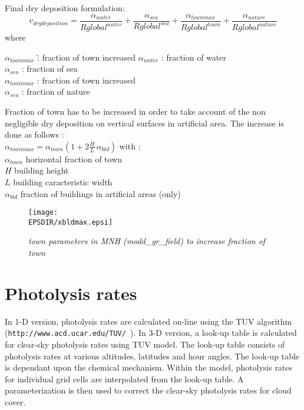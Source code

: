 Final dry deposition formulation:
$$
v_{dry deposition} = \frac{\alpha_{water}}{Rglobal^{water}} +
\frac{\alpha_{sea}}{Rglobal^{sea}} +
\frac{\alpha_{townmax}}{Rglobal^{town}} +
\frac{\alpha_{nature}}{Rglobal^{nature}}
$$
where\\ 
\begin{tabbing}
$\alpha_{townmax}$ \=: fraction of town increased \kill
$\alpha_{water}$ \> : fraction of water \\
$\alpha_{sea}$ \> : fraction of sea \\
$\alpha_{townmax}$ \> : fraction of town increased \\
$\alpha_{sea}$ \> : fraction of nature 
\end{tabbing}
Fraction of town has to be increased in order to take account of the non
negligible dry deposition on vertical surfaces in artificial
area. The increase is done as follows :\\
$\alpha_{townmax} = \alpha_{town} (1+2 \frac{H}{L} \, \alpha_{bld})$
with : \\
$\alpha_{town}$ horizontal fraction of town \\
$H$ building height \\
$L$ building caracteristic width \\
$\alpha_{bld}$ fraction of buildings in artificial areas (only)
\begin{figure}[hbp]
\begin{center}
\texttt{[image: \\EPSDIR/xbldmax.epsi]}
\end{center}
\label{bld}
\caption{\sl{town parameters in MNH (modd\_gr\_field) to increase
fraction of town}} 
\end{figure}

%
\section{Photolysis rates}
In 1-D version, photolysis rates are calculated on-line using the TUV algorithm 
\linebreak ({\tt http://www.acd.ucar.edu/TUV/ }). 
In 3-D version, a look-up table is calculated 
for clear-sky photolysis rates using TUV model. The look-up table consists 
of photolysis rates at various altitudes, latitudes and hour angles. 
The look-up table is dependant upon the chemical mechanism. 
Within the model, photolysis rates for individual grid cells are interpolated 
from the look-up table. A parameterization is then used to correct the 
clear-sky photolysis rates for cloud cover. 

